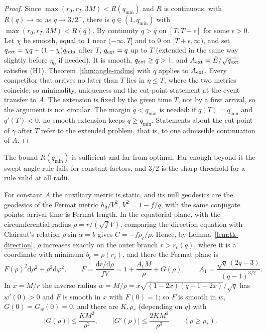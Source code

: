 \documentclass[aip,jmp,amsmath,amssymb,reprint]{revtex4-2}
\newcommand{\Ehat}{\hat E}
\newcommand{\dd}{\mathrm{d}}
\theoremstyle{plain}
\theoremstyle{definition}
\begin{document}
\begin{proof}
Since $\max(r_0,r_T,3M)<R(q_{\min})$ and $R$ is continuous, with $R(q)\to\infty$ as $q\to3/2^-$, there is
$\bar q\in(1,q_{\min})$ with $\max(r_0,r_T,3M)<R(\bar q)$. By continuity $q>\bar q$ on $[T,T+\epsilon]$ for some
$\epsilon>0$. Let $\chi$ be smooth, equal to $1$ near $(-\infty,T]$ and to $0$ on $[T+\epsilon,\infty)$, and set
$q_{\rm ext}=\chi q+(1-\chi)q_{\min}$ after $T$, $q_{\rm ext}=q$ up to $T$ (extended in the same way slightly
before $\eta_0$ if needed). It is smooth, $q_{\rm ext}\ge\bar q>1$, and $A_{\rm ext}=\Ehat/\sqrt{q_{\rm ext}}$
satisfies (H1). Theorem~\ref{thm:angle-radius} with $\bar q$ applies to $A_{\rm ext}$. Every competitor that
arrives no later than $T$ lies in $\eta\le T$, where the two metrics coincide; so minimality, uniqueness and
the cut-point statement at the event transfer to $A$. The extension is fixed by the given time $T$, not
by a first arrival, so the argument is not circular. The margin $\bar q<q_{\min}$ is needed: if $q(T)=q_{\min}$ and $q'(T)<0$, no smooth extension keeps
$q\ge q_{\min}$. Statements about the cut point of $\gamma$ after $T$ refer to the extended problem, that is, to one
admissible continuation of $A$.
\end{proof}

The bound $R(q_{\min})$ is sufficient and far from optimal. Far enough beyond it the swept-angle rule
fails for constant factors, and $3/2$ is the sharp threshold for a rule valid at all radii.

For constant $A$ the auxiliary metric is static, and its null geodesics are the geodesics of the
Fermat metric $h_0/V^2$, $V^2=1-f/q$, with the same conjugate points; arrival time is Fermat
length. In the equatorial plane, with the circumferential radius $\rho=r/(\sqrt fV)$, comparing the
direction equation with Clairaut's relation $\rho\sin\alpha=b$ gives $C=-f\rho_r/\rho$. Hence, by
Lemma~\ref{lem:tk-direction}, $\rho$ increases exactly on the outer branch $r>r_c(q)$, where it is a
coordinate with minimum $b_c=\rho(r_c)$, and there the Fermat plane is
\begin{equation}\label{eq:fermat-plane}
  F(\rho)^2\dd\rho^2+\rho^2\dd\varphi^2,\qquad
  F=\frac{\dd r/\dd\rho}{fV}=1+\frac{A_1M}{\rho}+G(\rho),\qquad
  A_1=\frac{\sqrt q\,(2q-3)}{(q-1)^{3/2}}.
\end{equation}
In $x=M/r$ the inverse radius $w=M/\rho=x\sqrt{(1-2x)(q-1+2x)}/\sqrt q$ has $w'(0)>0$ and $F$ is smooth in
$x$ with $F(0)=1$; so $F$ is smooth in $w$, $G(0)=G_w(0)=0$, and there are $K,\rho_*$ (depending on $q$) with
\begin{equation}\label{eq:G-bounds}
  |G(\rho)|\le\frac{KM^2}{\rho^2},\qquad |G'(\rho)|\le\frac{2KM^2}{\rho^3}\qquad(\rho\ge\rho_*).
\end{equation}
\end{document}
